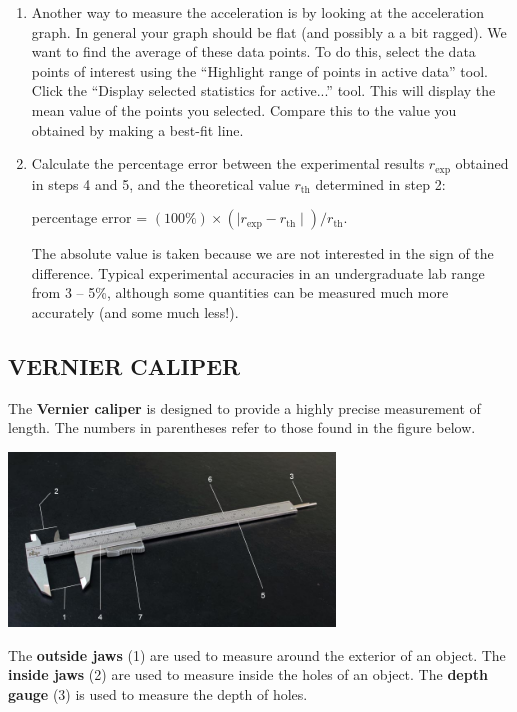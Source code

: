 \begin{enumerate}
\item Another way to measure the acceleration is by looking at the acceleration graph.  In general your graph should be flat (and possibly a a bit ragged).  We want to find the average of these data points.  To do this, select the data points of interest using the ``Highlight range of points in active data'' tool.  Click the ``Display selected statistics for active...'' tool.  This will display the mean value of the points you selected.  Compare this to the value you obtained by making a best-fit line.

\item Calculate the percentage error between the experimental results \(r_{\textrm{exp}}\) obtained in steps 4 and 5, and the theoretical value \(r_{\textrm{th}}\) determined in step 2:

percentage error = \( (100\%) \times \left(\mid r_{\textrm{exp}} - r_{\textrm{th}} \mid\right) / r_{\textrm{th}} . \)

The absolute value is taken because we are not interested in the sign of the difference.  Typical experimental accuracies in an undergraduate lab range from 3 -- 5\%, although some quantities can be measured much more accurately (and some much less!).

\end{enumerate}

\subsection*{VERNIER CALIPER}

The \textbf{Vernier caliper} is designed to provide a highly precise measurement of length.  The numbers in parentheses refer to those found in the figure below.
\begin{center} \includegraphics*[width=0.65\textwidth]{imgs/6labs/6Alab/6Aexp2/6A-EXP2-fig7_webtext.jpg} \end{center}

The \textbf{outside jaws} (1) are used to measure around the exterior of an object.  The \textbf{inside jaws} (2) are used to measure inside the holes of an object.  The \textbf{depth gauge} (3) is used to measure the depth of holes.

